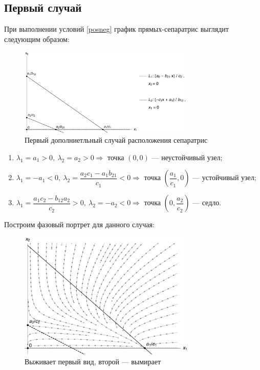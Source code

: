 \documentclass[12pt,a4paper]{article}
\begin{document}
    \subsection{Первый случай}
    При выполнении условий \eqref{posneg} график прямых-сепаратрис выглядит следующим образом:
    \begin{figure}[h]
        \centering
        \includegraphics[width=0.75\textwidth]{sep_3.pdf}
        \caption{Первый дополниетльный случай расположения сепаратрис}
        \label{fig:sep_3}
    \end{figure}
    \begin{enumerate}
        \setlength\itemsep{0.5em}
        \item $ \lambda_1 = a_1 > 0,\ \lambda_2 = a_2 > 0 \Rightarrow $ точка $ (0, 0) $ --- неустойчивый узел;
    
        \item $ \lambda_1 = -a_1 < 0,\ \lambda_2 = \dfrac{a_2 c_1 - a_1 b_{21}}{c_1} < 0 \Rightarrow $ точка $ \left( \dfrac{a_1}{c_1}, 0 \right) $ --- устойчивый узел;
        
        \item  $ \lambda_1 = \dfrac{a_1 c_2 - b_{12} a_2}{c_2} > 0,\ \lambda_2 = -a_2 < 0 \Rightarrow $ точка $ \left( 0, \dfrac{a_2}{c_2} \right) $ --- седло.
    \end{enumerate}
    \pagebreak
    Построим фазовый портрет для данного случая:
    \begin{figure}[h]
        \centering
        \includegraphics[width=0.75\textwidth]{phase_3.pdf}
        \caption{Выживает первый вид, второй --- вымирает}
        \label{fig:phase_3}
    \end{figure}
    
\end{document}
